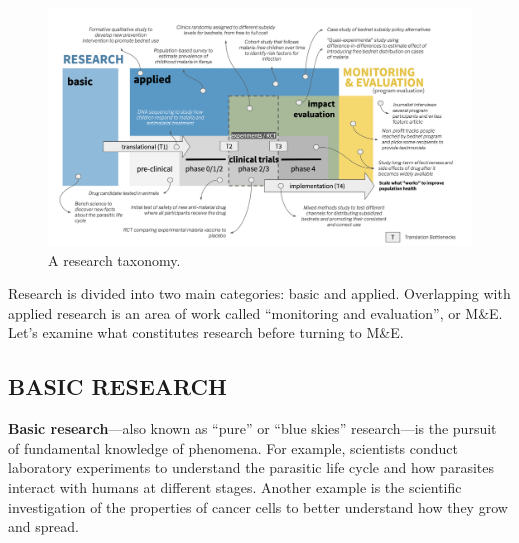 \documentclass[
  letterpaper,
  DIV=11,
  numbers=noendperiod,
  oneside]{scrreprt}
\begin{document}
\begin{figure}[h]

{\centering \includegraphics{./images/basicapplied.png}

}

\caption{\label{fig-basicapplied}A research taxonomy.}

\end{figure}

Research is divided into two main categories: basic and applied.
Overlapping with applied research is an area of work called ``monitoring
and evaluation'', or M\&E. Let's examine what constitutes research
before turning to M\&E.

\hypertarget{basic-research}{%
\subsection*{BASIC RESEARCH}\label{basic-research}}


\textbf{Basic research}---also known as ``pure'' or ``blue skies''
research---is the pursuit of fundamental knowledge of phenomena. For
example, scientists conduct laboratory experiments to understand the
parasitic life cycle and how parasites interact with humans at different
stages. Another example is the scientific investigation of the
properties of cancer cells to better understand how they grow and
spread.
\end{document}
